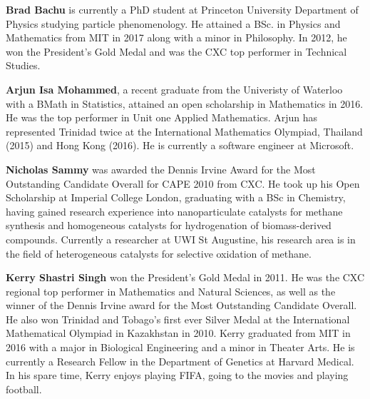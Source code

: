 \textbf{Brad Bachu} is currently a PhD student at Princeton
University Department of Physics studying particle phenomenology.
He attained a BSc. in Physics and Mathematics from MIT in 2017 along 
with a minor in Philosophy. In 2012, he won the President's Gold Medal
and was the CXC top performer in Technical Studies.

\vspace{5pt}

\noindent\textbf{Arjun Isa Mohammed}, a recent graduate from the 
Univeristy of Waterloo with a BMath in Statistics, 
attained an open scholarship in Mathematics in 2016.
He was the top performer in Unit one Applied Mathematics.
Arjun has represented Trinidad twice at the International
Mathematics Olympiad, Thailand (2015) and Hong Kong (2016).
He is currently a software engineer at Microsoft.
\vspace{5pt}

\noindent\textbf{Nicholas Sammy} was awarded the Dennis Irvine Award for 
the Most Outstanding Candidate Overall for CAPE 2010 from CXC. He took up 
his Open Scholarship at Imperial College London, graduating with a BSc in
Chemistry, having gained research experience into nanoparticulate catalysts 
for methane synthesis and homogeneous catalysts for hydrogenation of
biomass-derived compounds. Currently a researcher at UWI St Augustine,
his research area is in the field of heterogeneous catalysts for selective
oxidation of methane.

\vspace{5pt}

\noindent\textbf{Kerry Shastri Singh} won the President's Gold Medal in
2011. He was the CXC regional top performer in Mathematics and Natural
Sciences, as well as the winner of the Dennis Irvine award for the Most
Outstanding Candidate Overall. He also won Trinidad and Tobago's first
ever Silver Medal at the International Mathematical Olympiad in
Kazakhstan in 2010. Kerry graduated from MIT in 2016 with a major in
Biological Engineering and a minor in Theater Arts. He is currently a
Research Fellow in the Department of Genetics at Harvard Medical. In
his spare time, Kerry enjoys playing FIFA, going to the movies
and playing football.
